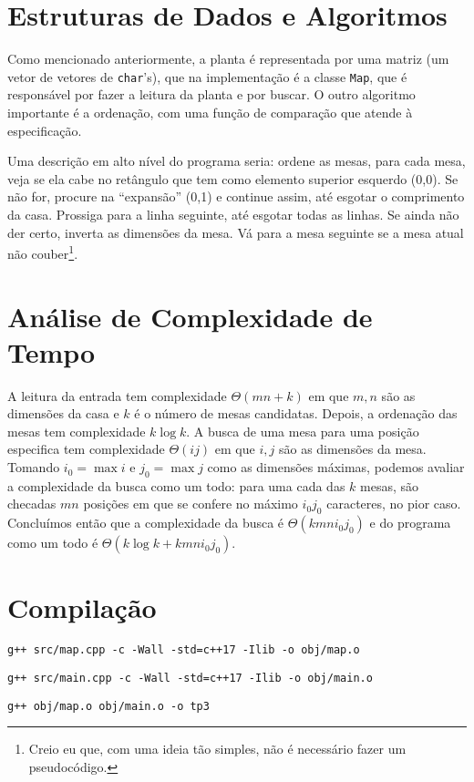 \documentclass{article}
\def\code#1{\texttt{#1}}
\begin{document}
\section{Estruturas de Dados e Algoritmos}

Como mencionado anteriormente, a planta é representada por uma matriz (um vetor de vetores de \code{char}'s), que na implementação é a classe \code{Map}, que é responsável por fazer a leitura da planta e por buscar. O outro algoritmo importante é a ordenação, com uma função de comparação que atende à especificação.

Uma descrição em alto nível do programa seria: ordene as mesas, para cada mesa, veja se ela cabe no retângulo que tem como elemento superior esquerdo (0,0). Se não for, procure na ``expansão'' (0,1) e continue assim, até esgotar o comprimento da casa. Prossiga para a linha seguinte, até esgotar todas as linhas. Se ainda não der certo, inverta as dimensões da mesa. Vá para a mesa seguinte se a mesa atual não couber\footnote{Creio eu que, com uma ideia tão simples, não é necessário fazer um pseudocódigo.}.

\section{Análise de Complexidade de Tempo}

A leitura da entrada tem complexidade \( \Theta(mn + k) \) em que \( m, n \) são as dimensões da casa e \( k \) é o número de mesas candidatas. Depois, a ordenação das mesas tem complexidade \( k \log k \). A busca de uma mesa para uma posição especifica tem complexidade \( \Theta(ij) \) em que \( i, j \) são as dimensões da mesa. Tomando \( i_0 = \max i \) e \( j_0 = \max j \) como as dimensões máximas, podemos avaliar a complexidade da busca como um todo: para uma cada das \( k \) mesas, são checadas \( mn \) posições em que se confere no máximo \( i_0j_0 \) caracteres, no pior caso. Concluímos então que a complexidade da busca é \( \Theta(kmni_0j_0) \) e do programa como um todo é \( \Theta(k \log k + kmni_0j_0) \).

\section{Compilação}

\texttt{g++ src/map.cpp -c -Wall -std=c++17 -Ilib -o obj/map.o}

\texttt{g++ src/main.cpp -c -Wall -std=c++17 -Ilib -o obj/main.o}

\texttt{g++ obj/map.o obj/main.o -o tp3}
\end{document}
